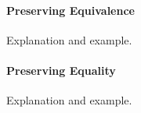 \paragraph{Preserving Equivalence} Explanation and example.

\paragraph{Preserving Equality} Explanation and example.








